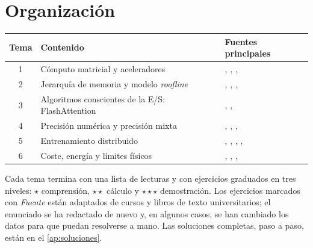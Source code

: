 \documentclass[11pt,a4paper,twoside,openany]{book}
\begin{document}
\section*{Organización}
\begin{center}\small
\begin{tabular}{@{}cll@{}}
\toprule
Tema & Contenido & Fuentes principales \\
\midrule
1 & Cómputo matricial y aceleradores & \cite{hp}, \cite{cs336}, \cite{jouppi}, \cite{kaplan} \\
2 & Jerarquía de memoria y modelo \emph{roofline} & \cite{roofline}, \cite{hp}, \cite{scaling}, \cite{hongkung} \\
3 & Algoritmos conscientes de la E/S: FlashAttention & \cite{flash}, \cite{milakov}, \cite{cs336} \\
4 & Precisión numérica y precisión mixta & \cite{higham}, \cite{micikevicius}, \cite{fp8}, \cite{mit65940} \\
5 & Entrenamiento distribuido & \cite{cs336}, \cite{megatron}, \cite{gpipe}, \cite{narayanan}, \cite{zero} \\
6 & Coste, energía y límites físicos & \cite{kaplan}, \cite{palm}, \cite{horowitz}, \cite{landauer} \\
\bottomrule
\end{tabular}
\end{center}

Cada tema termina con una lista de lecturas y con ejercicios graduados en tres niveles: $\star$ comprensión, $\star\star$ cálculo y $\star\star\star$ demostración. Los ejercicios marcados con \emph{Fuente} están adaptados de cursos y libros de texto universitarios; el enunciado se ha redactado de nuevo y, en algunos casos, se han cambiado los datos para que puedan resolverse a mano. Las soluciones completas, paso a paso, están en el \cref{ap:soluciones}.
\end{document}
